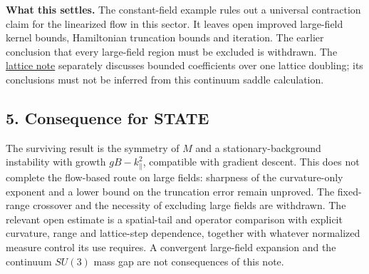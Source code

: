 \documentclass[11pt,a4paper]{article}
\begin{document}
\textbf{What this settles.} The constant-field example rules out a
universal contraction claim for the linearized flow in this sector. It
leaves open improved large-field kernel bounds, Hamiltonian truncation
bounds and iteration. The earlier conclusion that every large-field
region must be excluded is withdrawn. The
\href{flow-conjugation-truncation.md}{lattice note} separately discusses
bounded coefficients over one lattice doubling; its conclusions must not
be inferred from this continuum saddle calculation.

\subsection{5. Consequence for STATE}\label{consequence-for-state}

The surviving result is the symmetry of \(M\) and a
stationary-background instability with growth \(gB-k_\parallel^2\),
compatible with gradient descent. This does not complete the flow-based
route on large fields: sharpness of the curvature-only exponent and a
lower bound on the truncation error remain unproved. The fixed-range
crossover and the necessity of excluding large fields are withdrawn. The
relevant open estimate is a spatial-tail and operator comparison with
explicit curvature, range and lattice-step dependence, together with
whatever normalized measure control its use requires. A convergent
large-field expansion and the continuum \(SU(3)\) mass gap are not
consequences of this note.
\end{document}
